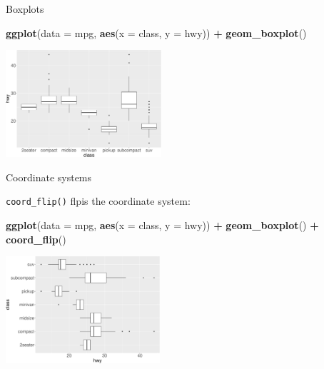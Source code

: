\documentclass[ignorenonframetext,]{beamer}
\newenvironment{Shaded}{\begin{snugshade}}{\end{snugshade}}
\newcommand{\DataTypeTok}[1]{\textcolor[rgb]{0.13,0.29,0.53}{#1}}
\newcommand{\KeywordTok}[1]{\textcolor[rgb]{0.13,0.29,0.53}{\textbf{#1}}}
\newcommand{\NormalTok}[1]{#1}
\newcommand{\OperatorTok}[1]{\textcolor[rgb]{0.81,0.36,0.00}{\textbf{#1}}}
\newcommand{\StringTok}[1]{\textcolor[rgb]{0.31,0.60,0.02}{#1}}
\begin{document}
\begin{frame}[fragile]{Boxplots}
\protect\hypertarget{boxplots-1}{}

\begin{Shaded}
\begin{Highlighting}[]
\KeywordTok{ggplot}\NormalTok{(}\DataTypeTok{data =}\NormalTok{ mpg, }\KeywordTok{aes}\NormalTok{(}\DataTypeTok{x =}\NormalTok{ class, }\DataTypeTok{y =}\NormalTok{ hwy)) }\OperatorTok{+}\StringTok{ }
\StringTok{  }\KeywordTok{geom_boxplot}\NormalTok{()}
\end{Highlighting}
\end{Shaded}

\begin{center}\includegraphics[height=150px]{data-visualization_files/figure-beamer/unnamed-chunk-137-1} \end{center}

\end{frame}

\begin{frame}[fragile]{Coordinate systems}
\protect\hypertarget{coordinate-systems}{}

\texttt{coord\_flip()} flpis the coordinate system:

\begin{Shaded}
\begin{Highlighting}[]
\KeywordTok{ggplot}\NormalTok{(}\DataTypeTok{data =}\NormalTok{ mpg, }\KeywordTok{aes}\NormalTok{(}\DataTypeTok{x =}\NormalTok{ class, }\DataTypeTok{y =}\NormalTok{ hwy)) }\OperatorTok{+}\StringTok{ }
\StringTok{  }\KeywordTok{geom_boxplot}\NormalTok{() }\OperatorTok{+}
\StringTok{  }\KeywordTok{coord_flip}\NormalTok{()}
\end{Highlighting}
\end{Shaded}

\begin{center}\includegraphics[height=150px]{data-visualization_files/figure-beamer/unnamed-chunk-138-1} \end{center}

\end{frame}
\end{document}
